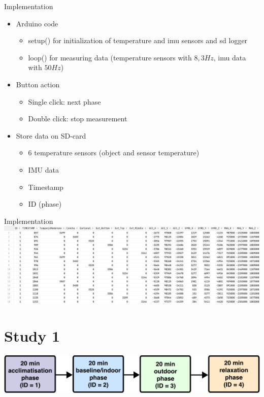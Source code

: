 \documentclass[en]{sdqbeamer}
\begin{document}
\begin{frame}{Implementation}
    \begin{itemize}
        \item Arduino code
        \begin{itemize}
            \item setup() for initialization of temperature and imu sensors and sd logger
            \item loop() for measuring data (temperature sensors with $8,3Hz$, imu data with $50Hz$)
        \end{itemize}
        \item Button action
        \begin{itemize}
            \item Single click: next phase
            \item Double click: stop measurement
        \end{itemize}
        \item Store data on SD-card
        \begin{itemize}
            \item 6 temperature sensors (object and sensor temperature)
            \item IMU data
            \item Timestamp
            \item ID (phase)
        \end{itemize}
    \end{itemize}
\end{frame}

\begin{frame}{Implementation}
    \includegraphics[width=\linewidth]{../thesis-doc/images/prototype/MeasurementRawDataSnippet_short.png} %
\end{frame}

\section{Study 1}
\begin{frame}%
    \includegraphics[width=0.95\linewidth]{../thesis-doc/images/study1/Procedure_short.pdf} %
\end{frame}
\end{document}

